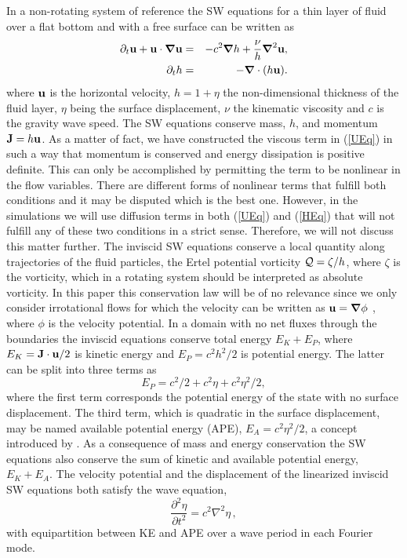 
In a non-rotating system of reference the SW equations for a thin layer of fluid over a flat bottom and with a free
surface can be written as  \cite[see for example][]{VallisLIVRE2006}
\begin{eqnarray} \label{UEq}
\partial_t \textbf{u} + \textbf{u}\cdot \boldsymbol{\nabla}  \textbf{u}
&=& - c^2 \boldsymbol{\nabla} h + \frac{\nu}{h}  \boldsymbol{\nabla}^2 \textbf{u},   \label{eq_uu}\\ \label{HEq}
\partial_t   h    &=& - \boldsymbol{\nabla} \cdot (h \textbf{u}).  \label{eq_h}
\end{eqnarray}
where $\textbf{u}$ is the horizontal velocity, $h = 1 + \eta $ the non-dimensional
thickness of the fluid layer, $ \eta $ being the surface displacement, $\nu$
the kinematic viscosity and $ c $ is the gravity wave speed. The SW equations
conserve mass, $ h $, and momentum $ {\bf J} = h{\bf u} $. As a matter of fact,
we have constructed the viscous term in (\ref{UEq}) in such a way that momentum
is conserved and energy dissipation is positive definite. This can only be
accomplished by permitting the term to be nonlinear in the flow variables.
There are different forms of nonlinear terms that fulfill both conditions and
it may be disputed which is the best one. However, in the simulations we will
use diffusion terms in both (\ref{UEq}) and (\ref{HEq}) that will not fulfill
any of these two conditions in a strict sense. Therefore, we will not discuss
this matter further. The inviscid SW equations conserve a local quantity along
trajectories of the fluid particles, the Ertel potential vorticity $\mathcal{Q} =
\zeta /h$, where $\zeta $ is the vorticity, which in a rotating system should
be interpreted as absolute vorticity. In this paper this conservation law will
be of no relevance since we only consider irrotational flows for which the
velocity can be written as $ \textbf{u} = \boldsymbol{\nabla} \phi $ , where $ \phi $ is the
velocity potential. In a domain with no net fluxes through the boundaries the
inviscid equations conserve total energy $ E_K + E_P $, where $ E_K = {\bf J}
\cdot {\textbf{u}} /2 $ is kinetic energy and $ E_P = c^{2} h^2/2 $ is potential
energy. The latter can be split into three terms as
\begin{equation}
E_P = c^2/2 + c^2\eta+ c^2 \eta^2/2,
\end{equation}
where the first term corresponds the potential energy of the state with no
surface displacement. The third term, which is quadratic in the surface
displacement, may be named available potential energy (APE), $E_A =
c^2\eta^2/2$, a concept introduced by \cite{Lorenz1955}. As a consequence of
mass and energy conservation the SW equations also conserve the sum of kinetic
and available potential energy, $ E_K + E_A $. The velocity potential and the
displacement of the linearized inviscid SW equations both satisfy the wave
equation,
\begin{equation}
\frac{\partial ^2 \eta}{\partial t^2} = c^2 \nabla^2 \eta \, ,
\end{equation}
with equipartition between KE and APE over a wave period in each Fourier mode.